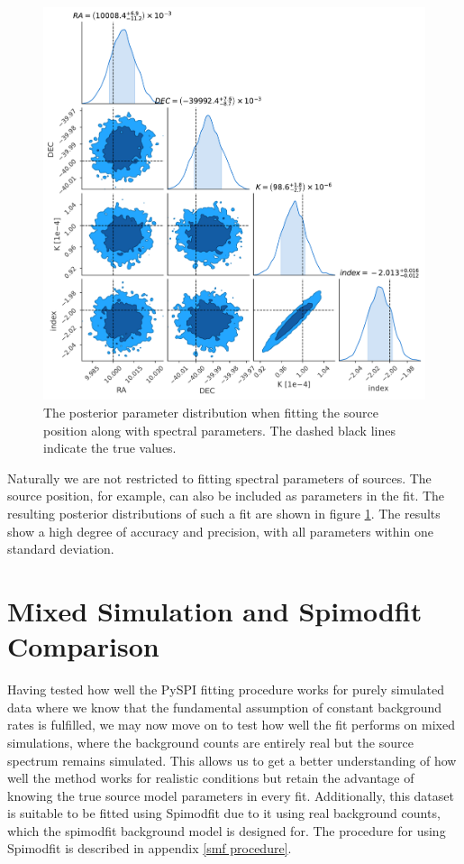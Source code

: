 \documentclass{report}
\begin{document}
\begin{figure}[h]
  \centering
  \includegraphics[width=\textwidth]{Images/Pure_Simulation/source_position.pdf}
  \caption{The posterior parameter distribution when fitting the source position along with spectral parameters. The dashed black lines indicate the true values.}
  \label{fig pos fit}
\end{figure}

Naturally we are not restricted to fitting spectral parameters of sources. The source position, for example, can also be included as parameters in the fit. The resulting posterior distributions of such a fit are shown in figure \ref{fig pos fit}. The results show a high degree of accuracy and precision, with all parameters within one standard deviation.


\section{Mixed Simulation and Spimodfit Comparison}




Having tested how well the PySPI fitting procedure works for purely simulated data where we know that the fundamental assumption of constant background rates is fulfilled, we may now move on to test how well the fit performs on mixed simulations, where the background counts are entirely real but the source spectrum remains simulated. This allows us to get a better understanding of how well the method works for realistic conditions but retain the advantage of knowing the true source model parameters in every fit. Additionally, this dataset is suitable to be fitted using Spimodfit due to it using real background counts, which the spimodfit background model is designed for. The procedure for using Spimodfit is described in appendix \ref{smf procedure}.
\end{document}
